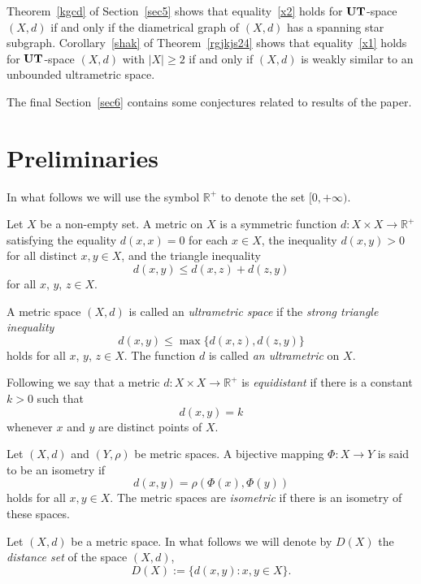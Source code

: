 \documentclass{article}
\begin{document}
Theorem~\ref{kgcd} of Section~\ref{sec5} shows that equality~\eqref{x2} holds for ${\bf UT}$-space $(X,d)$ if and only if the diametrical graph of $(X,d)$ has a spanning star subgraph.
Corollary~\ref{shak} of Theorem~\ref{rgjkjs24} shows that equality~\eqref{x1} holds for ${\bf UT}$-space $(X,d)$ with $|X|\geq 2$ if and only if $(X,d)$ is weakly similar to an unbounded ultrametric space.


The final Section~\ref{sec6} contains some conjectures related to results of the paper.







\section{Preliminaries}



In what follows we will use the symbol $\mathbb R^+$ to denote the set $[0,+\infty)$.


\begin{Definition}\label{deff1}Let $X$ be a non-empty set. A metric on $X$ is a symmetric function $d\colon X\times X \to \mathbb R^+$ satisfying the equality 
$d(x,x)=0$ for each $x\in X$, the inequality $d(x,y)>0$ for all distinct $x,y\in X$, and  the triangle inequality
 \[d(x,y)\leq d(x,z) + d(z,y)\]
 for all \(x\), \(y \), \(z \in X\).
\end{Definition}


A metric space \((X, d)\) is called an \emph{ultrametric space} if the \emph{strong triangle inequality}
\[
d(x,y)\leq \max \{d(x,z),d(z,y)\}
\]
holds for all \(x\), \(y\), \(z \in X\). The function \(d\) is called \emph{an ultrametric} on \(X\).


Following \cite[p.~46]{Dez-Dez} we say that a metric $d : X \times X \to \mathbb{R}^+$ is \emph{equidistant} if there is a constant $k > 0$ such that
\[
d(x,y) = k
\]
whenever $x$ and $y$ are distinct points of $X$.




\begin{Definition}\label{eddrr}
Let $(X,d)$ and $(Y,\rho)$ be metric spaces. A bijective mapping
\(
\Phi \colon X \to Y
\)
is said to be an isometry if
\[
d(x,y) = \rho(\Phi(x), \Phi(y))
\]
holds for all $x,y \in X$. The metric spaces are \emph{isometric} if there is an
isometry of these spaces.
\end{Definition}


Let $(X,d)$ be a metric space. In what follows we will denote by $D(X)$ the \textit{distance set} of the space $(X,d)$,
\begin{equation}
    \label{tghii11}
D(X) := \{ d(x,y) : x,y \in X \}.
\end{equation}
\end{document}

